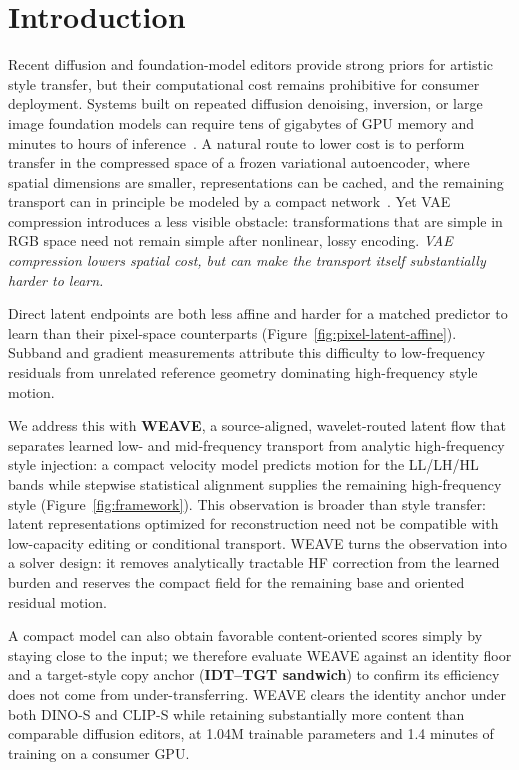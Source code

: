 \documentclass[letterpaper]{article} %
\begin{document}
\section{Introduction}

Recent diffusion and foundation-model editors provide strong priors for artistic style
transfer, but their computational cost remains prohibitive for consumer deployment. Systems
built on repeated diffusion denoising, inversion, or large image foundation models can
require tens of gigabytes of GPU memory and minutes to hours of
inference~\cite{wu2025qwenimagetechnicalreport,blackforestlabs2025flux2,chung2024style,hertz2024style,lu2024zstar}.
A natural route to lower cost is to perform transfer in the compressed space of a frozen
variational autoencoder, where spatial dimensions are smaller, representations can be
cached, and the remaining transport can in principle be modeled by a compact
network~\cite{rombach2022high}. Yet VAE compression introduces a less visible obstacle:
transformations that are simple in RGB space need not remain simple after nonlinear, lossy
encoding. \emph{VAE compression lowers spatial cost, but can make the transport itself
substantially harder to learn.}

Direct latent endpoints are both less affine and harder for a matched predictor to learn
than their pixel-space counterparts (Figure~\ref{fig:pixel-latent-affine}). Subband and
gradient measurements attribute this difficulty to low-frequency residuals from unrelated
reference geometry dominating high-frequency style motion.

We address this with \textbf{WEAVE}, a source-aligned, wavelet-routed latent flow that
separates learned low- and mid-frequency transport from analytic high-frequency style
injection: a compact velocity model predicts motion for the LL/LH/HL bands while stepwise
statistical alignment supplies the remaining high-frequency style
(Figure~\ref{fig:framework}). This observation is broader than style transfer: latent
representations optimized for reconstruction need not be compatible with low-capacity editing
or conditional transport. WEAVE turns the observation into a solver design: it removes
analytically tractable HF correction from the learned burden and reserves the compact field
for the remaining base and oriented residual motion.

A compact model can also obtain favorable content-oriented scores simply by staying close
to the input; we therefore evaluate WEAVE against an identity floor and a target-style copy
anchor (\textbf{IDT--TGT sandwich}) to confirm its efficiency does not come from
under-transferring. WEAVE clears the identity anchor under both DINO-S and CLIP-S while
retaining substantially more content than comparable diffusion editors, at 1.04M trainable
parameters and 1.4 minutes of training on a consumer GPU.
\end{document}
